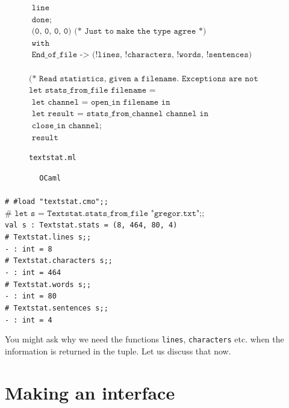 \documentclass[]{book}
\newcommand{\smspace}{\vspace{4mm}}
\begin{document}
\begin{figure}
\begin{center}
{\begin{minipage}{0.9\textwidth}
$\texttt{\ \ \ \ \ \ \ \ \ \ \ \ line}$\\
$\texttt{\ \ \ \ \ \ done;}$\\
$\texttt{\ \ \ \ \ \ (0, 0, 0, 0) (* Just to make the type agree *)}$\\
$\texttt{\ \ \ \ with}$\\
$\texttt{\ \ \ \ \ \ End\_of\_file -> (!lines, !characters, !words, !sentences)}$\\
\\
$\texttt{(* Read statistics, given a filename.\ Exceptions are not handled *)}$\\
$\texttt{let stats\_from\_file filename =}$\\
$\texttt{\ \ let channel = open\_in filename in}$\\
$\texttt{\ \ \ \ let result = stats\_from\_channel channel in}$\\
$\texttt{\ \ \ \ \ \ close\_in channel;}$\\
$\texttt{\ \ \ \ \ \ result}$\vphantom{g}
\end{minipage}}
\end{center}
\caption{\small\texttt{textstat.ml}}
\label{textstat2.ml}
\end{figure}


\smspace
\noindent\verb!        OCaml!\\
\noindent\\
\noindent\texttt{\# \#load "textstat.cmo";;}\\
\noindent$\texttt{\#\ let\ s\ =\ Textstat.stats_from_file "gregor.txt";;}$\\
\noindent\texttt{val s :\ Textstat.stats = (8, 464, 80, 4)}\\
\noindent\texttt{\# Textstat.lines s;;}\\
\noindent\texttt{- :\ int = 8}\\
\noindent\texttt{\# Textstat.characters s;;}\\
\noindent\texttt{- :\ int = 464}\\
\noindent\texttt{\# Textstat.words s;;}\\
\noindent\texttt{- :\ int = 80}\\
\noindent\texttt{\# Textstat.sentences s;;}\\
\noindent\texttt{- :\ int = 4}\vphantom{g}
\smspace

\noindent You might ask why we need the functions \texttt{lines}, \texttt{characters} etc. when the information is returned in the tuple. Let us discuss that now.

\section*{Making an interface}
\end{document}
